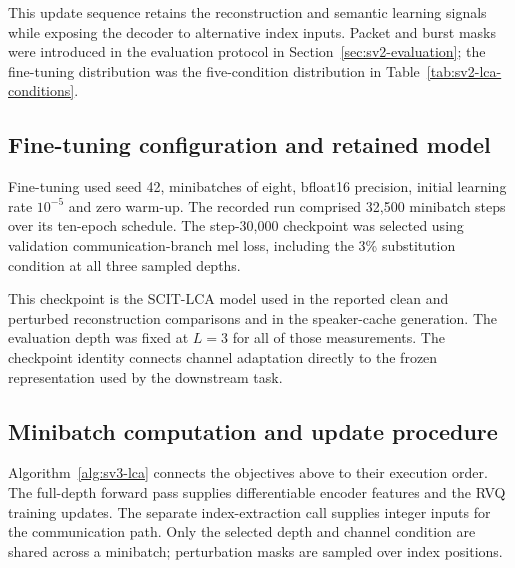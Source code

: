 This update sequence retains the reconstruction and semantic learning signals while exposing the decoder to alternative index inputs. Packet and burst masks were introduced in the evaluation protocol in Section~\ref{sec:sv2-evaluation}; the fine-tuning distribution was the five-condition distribution in Table~\ref{tab:sv2-lca-conditions}.

\subsection{Fine-tuning configuration and retained model}
Fine-tuning used seed 42, minibatches of eight, bfloat16 precision, initial learning rate $10^{-5}$ and zero warm-up. The recorded run comprised 32,500 minibatch steps over its ten-epoch schedule. The step-30,000 checkpoint was selected using validation communication-branch mel loss, including the 3\% substitution condition at all three sampled depths.

This checkpoint is the SCIT-LCA model used in the reported clean and perturbed reconstruction comparisons and in the speaker-cache generation. The evaluation depth was fixed at $L=3$ for all of those measurements. The checkpoint identity connects channel adaptation directly to the frozen representation used by the downstream task.

\subsection{Minibatch computation and update procedure}
Algorithm~\ref{alg:sv3-lca} connects the objectives above to their execution order. The full-depth forward pass supplies differentiable encoder features and the RVQ training updates. The separate index-extraction call supplies integer inputs for the communication path. Only the selected depth and channel condition are shared across a minibatch; perturbation masks are sampled over index positions.

